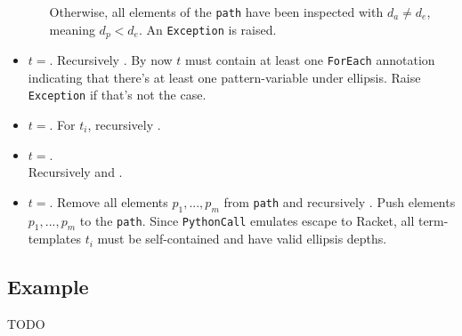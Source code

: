 \begin{itemize}
\begin{itemize}
	  Otherwise, all elements of the \texttt{path} have been inspected with $d_a \neq d_e$, meaning $d_p < d_e$. An \texttt{Exception} is raised.
	\end{itemize}
\item
$t=$\TermRepeat. Recursively . By now $t$ must contain at least one \texttt{ForEach} annotation indicating that there's at least one pattern-variable under ellipsis. Raise \texttt{Exception} if that's not the case.
\item
$t=$\TermSequence. For $t_i$, recursively .
\item
$t=$\TermInHole. \\ Recursively  and .
\item
$t=$\PythonCall. Remove all elements $p_1, ..., p_m$ from \texttt{path} and recursively . Push elements $p_1, ..., p_m$ to the \texttt{path}. Since \texttt{PythonCall} emulates escape to Racket, all term-templates $t_i$ must be self-contained and have valid ellipsis depths.
\end{itemize}

\subsection{Example}
TODO


